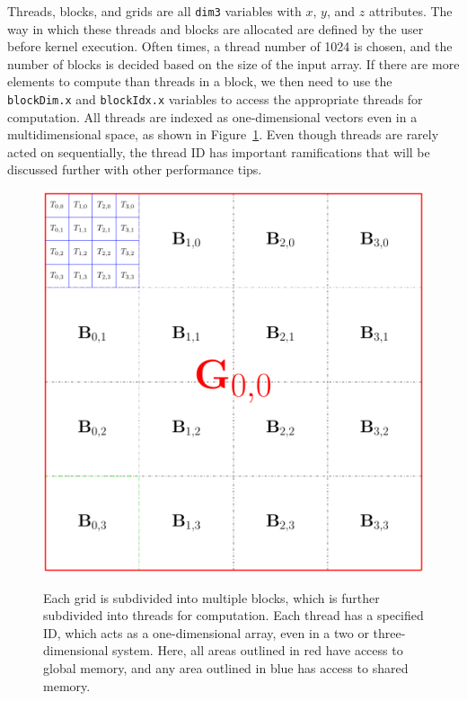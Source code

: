 Threads, blocks, and grids are all \texttt{dim3} variables with $x$, $y$, and $z$ attributes.
The way in which these threads and blocks are allocated are defined by the user before kernel execution.
Often times, a thread number of 1024 is chosen, and the number of blocks is decided based on the size of the input array.
If there are more elements to compute than threads in a block, we then need to use the \texttt{blockDim.x} and \texttt{blockIdx.x} variables to access the appropriate threads for computation.
All threads are indexed as one-dimensional vectors even in a multidimensional space, as shown in Figure~\ref{fig:threadsnblocks}.
Even though threads are rarely acted on sequentially, the thread ID has important ramifications that will be discussed further with other performance tips.

\begin{figure}
\includegraphics[width=\textwidth]{data/gpu/gputhreads.pdf}
\label{fig:threadsnblocks}
\caption{Each grid is subdivided into multiple blocks, which is further subdivided into threads for computation. Each thread has a specified ID, which acts as a one-dimensional array, even in a two or three-dimensional system. Here, all areas outlined in red have access to global memory, and any area outlined in blue has access to shared memory. }
\end{figure}


